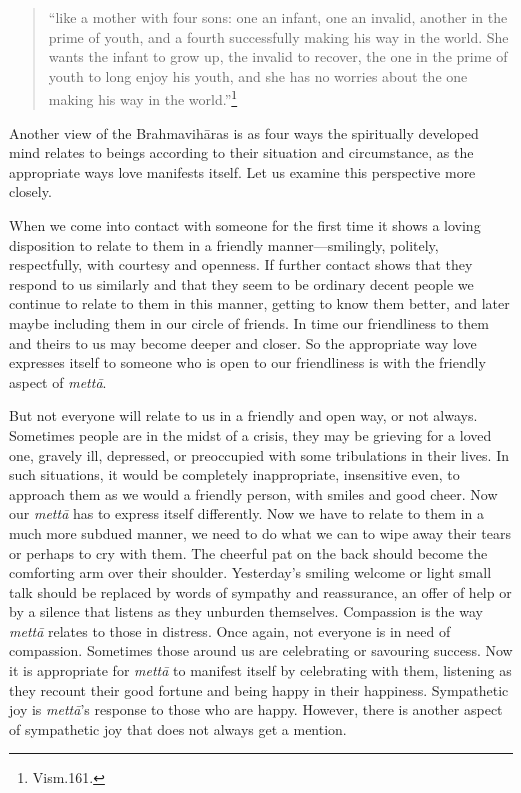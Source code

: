 \documentclass[10pt, openright]{book}
\begin{document}
\begin{quote}


“like a mother with four sons: one an infant, one an invalid, another in the prime of youth, and a fourth successfully making his way in the world. She wants the infant to grow up, the invalid to recover, the one in the prime of youth to long enjoy his youth, and she has no worries about the one making his way in the world.”\footnote {Vism.161.}




\end{quote}
Another view of the Brahmavihāras is as four ways the spiritually developed mind relates to beings according to their situation and circumstance, as the appropriate ways love manifests itself. Let us examine this perspective more closely.


When we come into contact with someone for the first time it shows a loving disposition to relate to them in a friendly manner—smilingly, politely, respectfully, with courtesy and openness. If further contact shows that they respond to us similarly and that they seem to be ordinary decent people we continue to relate to them in this manner, getting to know them better, and later maybe including them in our circle of friends. In time our friendliness to them and theirs to us may become deeper and closer. So the appropriate way love expresses itself to someone who is open to our friendliness is with the friendly aspect of \textit{mettā}.


But not everyone will relate to us in a friendly and open way, or not always. Sometimes people are in the midst of a crisis, they may be grieving for a loved one, gravely ill, depressed, or preoccupied with some tribulations in their lives. In such situations, it would be completely inappropriate, insensitive even, to approach them as we would a friendly person, with smiles and good cheer. Now our \textit{mettā} has to express itself differently. Now we have to relate to them in a much more subdued manner, we need to do what we can to wipe away their tears or perhaps to cry with them. The cheerful pat on the back should become the comforting arm over their shoulder. Yesterday’s smiling welcome or light small talk should be replaced by words of sympathy and reassurance, an offer of help or by a silence that listens as they unburden themselves. Compassion is the way \textit{mettā} relates to those in distress. Once again, not everyone is in need of compassion. Sometimes those around us are celebrating or savouring success. Now it is appropriate for \textit{mettā} to manifest itself by celebrating with them, listening as they recount their good fortune and being happy in their happiness. Sympathetic joy is \textit{mettā}’s response to those who are happy. However, there is another aspect of sympathetic joy that does not always get a mention.
\end{document}
